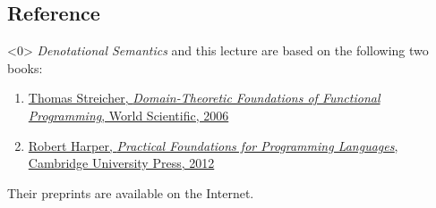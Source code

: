 \subsection*{Reference}
\begin{frame}<0>
  \emph{Denotational Semantics} and this lecture are based on the following 
  two books:
  \begin{enumerate}
    \item
      \href{http://www.mathematik.tu-darmstadt.de/~streicher/MGFP/MGFP.pdf.gz}{Thomas Streicher, \emph{Domain-Theoretic Foundations of Functional
      Programming}, World Scientific, 2006}
    \item \href{http://www.cs.cmu.edu/~rwh/plbook/book.pdf}{Robert Harper, \emph{Practical Foundations for Programming
        Languages}, Cambridge University Press, 2012}
  \end{enumerate}
  Their preprints are available on the Internet.
\end{frame}


